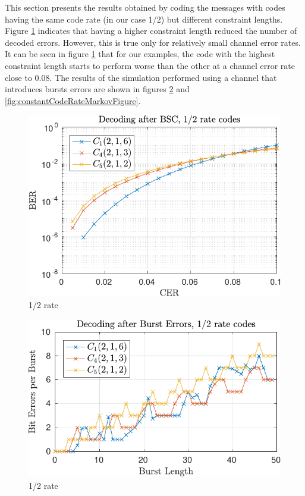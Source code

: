 This section presents the results obtained by coding the messages with codes having the same code rate (in our case 1/2) but different constraint lengths. Figure \ref{fig:constantCodeRateRandomFigure} indicates that having a higher constraint length reduced the number of decoded errors. However, this is true only for relatively small channel error rates. It can be seen in figure \ref{fig:constantCodeRateRandomFigure} that for our examples, the code with the highest constraint length starts to perform worse than the other at a channel error rate close to 0.08. 
The results of the simulation performed using a channel that introduces bursts errors are shown in figures \ref{fig:constantCodeRateBurstFigure} and \ref{fig:constantCodeRateMarkovFigure}. 


\begin{figure}
\centering
\includegraphics[scale=1]{../figures/extra12rand.pdf} 
\caption{1/2 rate\label{fig:constantCodeRateRandomFigure}}
\end{figure}

\begin{figure}
\centering
\includegraphics[scale=1]{../figures/extra12burst.pdf} 
\caption{1/2 rate\label{fig:constantCodeRateBurstFigure}}
\end{figure}

